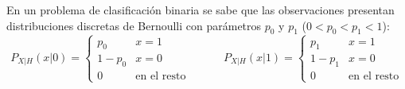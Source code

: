 \ifspanish

\question En un problema de clasificación binaria se sabe que las observaciones presentan distribuciones discretas de Bernoulli con parámetros $p_0$ y $p_1$ ($0 < p_0 < p_1 < 1$):
 $$ P_{X|H}(x | 0) = \left\lbrace  \begin{array}{ll}  
					   p_0 & x=1 \\ 1-p_0 & x=0 \\0 & \mbox{en el resto}					   
					    \end{array}  \right.  \quad \quad \quad 
P_{X|H}(x | 1) = \left\lbrace  \begin{array}{ll}  
					   p_1 & x=1 \\ 1-p_1 & x=0 \\0 & \mbox{en el resto}					   
					    \end{array}  \right.			$$		    
					    
